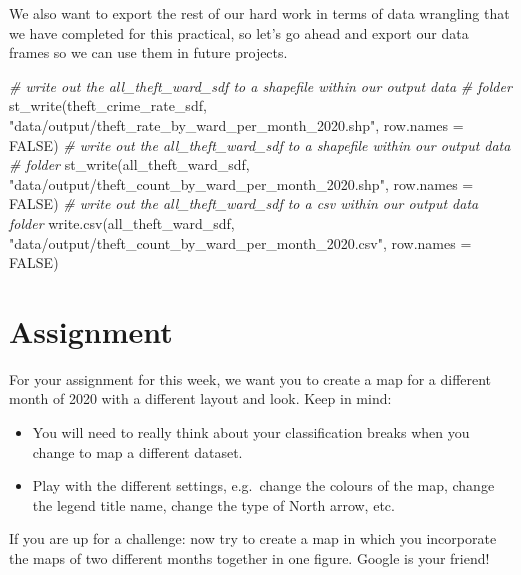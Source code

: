 \documentclass[
]{book}
\newenvironment{Shaded}{\begin{snugshade}}{\end{snugshade}}
\newcommand{\AttributeTok}[1]{\textcolor[rgb]{0.77,0.63,0.00}{#1}}
\newcommand{\CommentTok}[1]{\textcolor[rgb]{0.56,0.35,0.01}{\textit{#1}}}
\newcommand{\ConstantTok}[1]{\textcolor[rgb]{0.00,0.00,0.00}{#1}}
\newcommand{\FunctionTok}[1]{\textcolor[rgb]{0.00,0.00,0.00}{#1}}
\newcommand{\NormalTok}[1]{#1}
\newcommand{\StringTok}[1]{\textcolor[rgb]{0.31,0.60,0.02}{#1}}
\providecommand{\tightlist}{%
  \setlength{\itemsep}{0pt}\setlength{\parskip}{0pt}}
\begin{document}
We also want to export the rest of our hard work in terms of data wrangling that we have completed for this practical, so let's go ahead and export our data frames so we can use them in future projects.

\begin{Shaded}
\begin{Highlighting}[]
\CommentTok{\# write out the all\_theft\_ward\_sdf to a shapefile within our output data}
\CommentTok{\# folder}
\FunctionTok{st\_write}\NormalTok{(theft\_crime\_rate\_sdf, }\StringTok{"data/output/theft\_rate\_by\_ward\_per\_month\_2020.shp"}\NormalTok{,}
    \AttributeTok{row.names =} \ConstantTok{FALSE}\NormalTok{)}
\CommentTok{\# write out the all\_theft\_ward\_sdf to a shapefile within our output data}
\CommentTok{\# folder}
\FunctionTok{st\_write}\NormalTok{(all\_theft\_ward\_sdf, }\StringTok{"data/output/theft\_count\_by\_ward\_per\_month\_2020.shp"}\NormalTok{,}
    \AttributeTok{row.names =} \ConstantTok{FALSE}\NormalTok{)}
\CommentTok{\# write out the all\_theft\_ward\_sdf to a csv within our output data folder}
\FunctionTok{write.csv}\NormalTok{(all\_theft\_ward\_sdf, }\StringTok{"data/output/theft\_count\_by\_ward\_per\_month\_2020.csv"}\NormalTok{,}
    \AttributeTok{row.names =} \ConstantTok{FALSE}\NormalTok{)}
\end{Highlighting}
\end{Shaded}

\hypertarget{assignment-w05}{%
\section{Assignment}\label{assignment-w05}}

For your assignment for this week, we want you to create a map for a different month of 2020 with a different layout and look. Keep in mind:

\begin{itemize}
\tightlist
\item
  You will need to really think about your classification breaks when you change to map a different dataset.
\item
  Play with the different settings, e.g.~change the colours of the map, change the legend title name, change the type of North arrow, etc.
\end{itemize}

If you are up for a challenge: now try to create a map in which you incorporate the maps of two different months together in one figure. Google is your friend!
\end{document}
